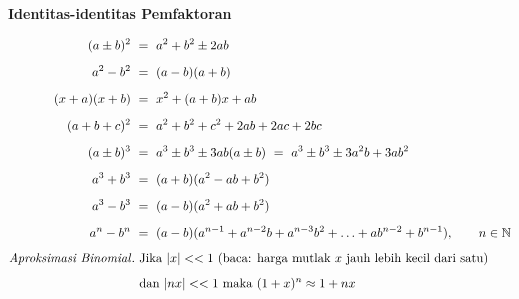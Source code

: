 \documentclass[12pt, a4paper]{article}\usepackage[utf8]{inputenc}
\theoremstyle{plain}
\theoremstyle{plain}
\numberwithin{equation}{section}
\theoremstyle{definition}
\begin{document}
	\vspace{2em}
	
	\begin{center}
		\textbf{Identitas-identitas Pemfaktoran}
	\end{center}
	
	\vspace{-2em}
	
	\begin{align*}
		(a \pm b)^2 \ &= \ a^2 + b^2 \pm 2ab \\[.5em]
		a^2 - b^2 \ &= \ (a - b)(a + b)\\[.5em]
		(x + a)(x + b) \ &= \ x^2 + (a+b)x + ab\\[.5em]
		(a + b + c)^2 \ &= \ a^2 + b^2 + c^2 + 2ab + 2ac + 2bc\\[.5em]
		(a \pm b)^3 \ &= \ a^3 \pm b^3 \pm 3ab(a \pm b) \ = \ a^3 \pm b^3 \pm 3a^2b + 3ab^2 \\[.5em]
		a^3 + b^3 \ &= \ (a + b)(a^2 - ab + b^2)\\[.5em]
		a^3 - b^3 \ &= \ (a - b)(a^2 + ab + b^2)\\[.5em]
		a^n - b^n \ &= \ (a - b)(a^{n-1} + a^{n-2} b + a^{n-3}b^2 + \ldots + ab^{n-2} + b^{n-1}), \qquad n \in \mathbb{N} \\[.5em]
		\text{\emph{Aproksimasi Binomial}}. & \text{ Jika $ |x| << 1$ (baca: harga mutlak $x$ jauh lebih kecil dari satu)}\\[.5em] & \text{ dan $|nx| << 1$ maka } (1 + x)^n \approx 1 + nx
	\end{align*}

	
	
\end{document}
